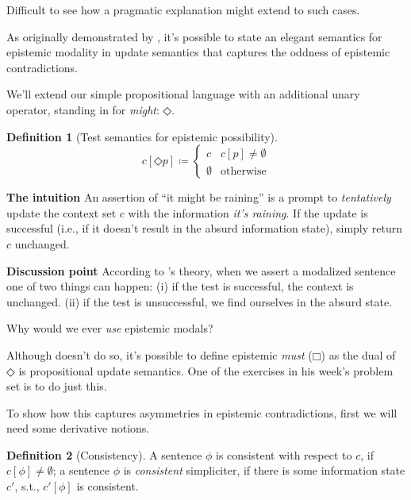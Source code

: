 \documentclass[nols,twoside,nofonts,nobib,nohyper]{tufte-handout}
\theoremstyle{definition}
\newtheorem{definition}{Definition}[section]
\begin{document}
Difficult to see how a pragmatic explanation might extend to such cases.

As originally demonstrated by \citet{Veltman1996}, it's possible to state an elegant semantics for epistemic modality in update semantics that captures the oddness of epistemic contradictions.

We'll extend our simple propositional language with an additional unary operator, standing in for \textit{might}: $◇$.

\begin{definition}[Test semantics for epistemic possibility]
  $$
  c[◇ p] ≔ \begin{cases}
    c&c[p] ≠ ∅\\
    ∅&\text{otherwise}
    \end{cases}
  $$
\end{definition}

\begin{tcolorbox}
  \textbf{The intuition}
  \tcblower
  An assertion of \enquote{it might be raining} is a prompt to \textit{tentatively} update the context set $c$ with the information \textit{it's raining}. If the update is successful (i.e., if it doesn't result in the absurd information state), simply return $c$ unchanged.
\end{tcolorbox}

\begin{tcolorbox}
  \textbf{Discussion point}
  \tcblower
  According to \citeauthor{Veltman1996}'s theory, when we assert a modalized sentence one of two things can happen: (i) if the test is successful, the context is unchanged. (ii) if the test is unsuccessful, we find ourselves in the absurd state.

  Why would we ever \textit{use} epistemic modals?
\end{tcolorbox}

Although \citeauthor{Veltman1996} doesn't do so, it's possible to define epistemic \textit{must} ($□$) as the dual of $◇$ is propositional update semantics. One of the exercises in his week's problem set is to do just this.

To show how this captures asymmetries in epistemic contradictions, first we will need some derivative notions.

\begin{definition}[Consistency]
A sentence $ϕ$ is consistent with respect to $c$, if $c[ϕ] ≠ ∅$; a sentence $ϕ$ is \textit{consistent} simpliciter, if there is some information state $c'$, s.t., $c'[ϕ]$ is consistent.
\end{definition}
\end{document}
